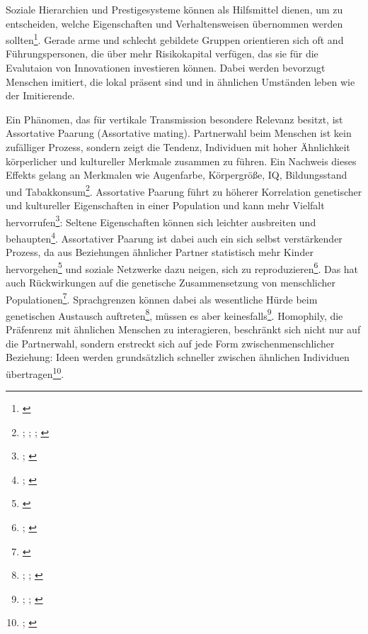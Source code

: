 \documentclass[openany,twoside,twocolumn]{book}
\let\rmarkdownfootnote\footnote%
\def\footnote{\protect\rmarkdownfootnote}
\begin{document}
Soziale Hierarchien und Prestigesysteme können als Hilfsmittel dienen,
um zu entscheiden, welche Eigenschaften und Verhaltensweisen übernommen
werden sollten\footnote{\textcite{rogers_diffusion_1983}}. Gerade arme
und schlecht gebildete Gruppen orientieren sich oft and
Führungspersonen, die über mehr Risikokapital verfügen, das sie für die
Evalutaion von Innovationen investieren können. Dabei werden bevorzugt
Menschen imitiert, die lokal präsent sind und in ähnlichen Umständen
leben wie der Imitierende.

Ein Phänomen, das für vertikale Transmission besondere Relevanz besitzt,
ist Assortative Paarung (Assortative mating). Partnerwahl beim Menschen
ist kein zufälliger Prozess, sondern zeigt die Tendenz, Individuen mit
hoher Ähnlichkeit körperlicher und kultureller Merkmale zusammen zu
führen. Ein Nachweis dieses Effekts gelang an Merkmalen wie Augenfarbe,
Körpergröße, IQ, Bildungsstand und Tabakkonsum\footnote{\textcite{domingue_genetic_2014};
  \textcite{keller_genetic_2013}; \textcite{laeng_why_2007};
  \textcite{treur_spousal_2015}}. Assortative Paarung führt zu höherer
Korrelation genetischer und kultureller Eigenschaften in einer
Population und kann mehr Vielfalt hervorrufen\footnote{\textcite{feldman_evolution_1977};
  \textcite{rice_multifactorial_1978}}: Seltene Eigenschaften können
sich leichter ausbreiten und behaupten\footnote{\textcite{creanza_complexity_2014};
  \textcite{creanza_models_2012}}. Assortativer Paarung ist dabei auch
ein sich selbst verstärkender Prozess, da aus Beziehungen ähnlicher
Partner statistisch mehr Kinder hervorgehen\footnote{\textcite{thiessen_human_1980}}
und soziale Netzwerke dazu neigen, sich zu reproduzieren\footnote{\textcite{abdellaoui_association_2013};
  \textcite{abdellaoui_educational_2015}}. Das hat auch Rückwirkungen
auf die genetische Zusammensetzung von menschlicher
Populationen\footnote{\textcite{robinson_genetic_2017}}. Sprachgrenzen
können dabei als wesentliche Hürde beim genetischen Austausch
auftreten\footnote{\textcite{barbujani_zones_1990};
  \textcite{de_filippo_y-chromosomal_2011};
  \textcite{karafet_coevolution_2016}}, müssen es aber
keinesfalls\footnote{\textcite{hunley_gene_2005};
  \textcite{hunley_genetic_2008}; \textcite{srithawong_genetic_2015}}.
Homophily, die Präfenrenz mit ähnlichen Menschen zu interagieren,
beschränkt sich nicht nur auf die Partnerwahl, sondern erstreckt sich
auf jede Form zwischenmenschlicher Beziehung: Ideen werden grundsätzlich
schneller zwischen ähnlichen Individuen übertragen\footnote{\textcite{centola_experimental_2011};
  \textcite{centola_spread_2010}}.
\end{document}
